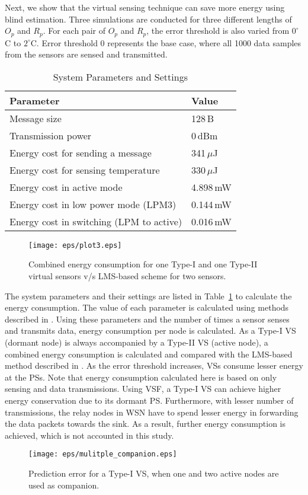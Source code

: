 \documentclass[a4paper,conference]{IEEEtran}
\begin{document}
Next, we show that the virtual sensing technique can save more energy using blind estimation. Three simulations are conducted for three different lengths of $O_{p}$ and $R_{p}$. For each pair of $O_{p}$ and $R_{p}$, the error threshold is also varied from $0^{\circ}$C to $2^{\circ}$C. Error threshold 0 represents the base case, where all 1000 data samples from the sensors are sensed and transmitted. 
\begin{table}
\centering
\caption{System Parameters and Settings}
\begin{tabular}{|l|l|} \hline
\textbf{Parameter} & \textbf{Value} \\ \hline
Message size & 128\,B \\ \hline
Transmission power & 0\,dBm \\ \hline
Energy cost for sending a message & 341\,$\mu$J \\ \hline
Energy cost for sensing temperature & 330\,$\mu$J \\ \hline
Energy cost in active mode & 4.898\,mW \\ \hline
Energy cost in low power mode (LPM3) & 0.144\,mW \\ \hline
Energy cost in switching (LPM to active) & 0.016\,mW \\
\hline\end{tabular}
\label{settings}
\end{table}
\begin{figure}[]
\centering
\texttt{[image: eps/plot3.eps]}
\caption{Combined energy consumption for one Type-I and one Type-II virtual sensors v/s LMS-based scheme for two sensors.}
\label{fig:energy}
\end{figure}

The system parameters and their settings are listed in Table~\ref{settings} to calculate the energy consumption. The value of each parameter is calculated using methods described in \cite{amiri2010measurements,prabhakar2012zen}. Using these parameters and the number of times a sensor senses and transmits data, energy consumption per node is calculated. As a Type-I VS (dormant node) is always accompanied by a Type-II VS (active node), a combined energy consumption is calculated and compared with the LMS-based method described in \cite{santini2006adaptive}. As the error threshold increases, VSs consume lesser energy at the PSs. Note that energy consumption calculated here is based on only sensing and data transmissions. Using VSF, a Type-I VS can achieve higher energy conservation due to its dormant PS. Furthermore, with lesser number of transmissions, the relay nodes in WSN have to spend lesser energy in forwarding the data packets towards the sink. As a result, further energy consumption is achieved, which is not accounted in this study.
\begin{figure}
\centering
\texttt{[image: eps/mulitple\_companion.eps]}
\caption{Prediction error for a Type-I VS, when one and two active nodes are used as companion.}
\label{fig:multi}
\end{figure}
\end{document}
